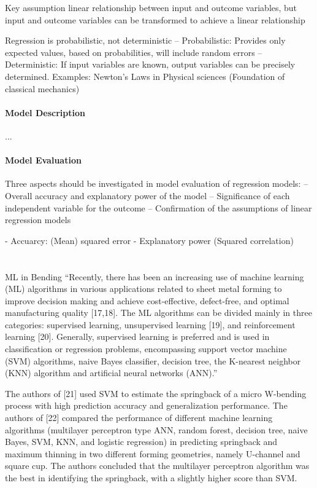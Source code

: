 Key assumption linear relationship between input and outcome variables, but input and outcome variables can be transformed to achieve a linear relationship 

Regression is probabilistic, not deterministic 
– Probabilistic: Provides only expected values, based on probabilities, will include random errors 
– Deterministic: If input variables are known, output variables can be precisely determined. Examples: Newton’s Laws in Physical sciences (Foundation of classical mechanics)

\paragraph{Model Description}
...

\paragraph{Model Evaluation} 
Three aspects should be investigated in model evaluation of regression models: 
– Overall accuracy and explanatory power of the model 
– Significance of each independent variable for the outcome 
– Confirmation of the assumptions of linear regression models

- Accuarcy: (Mean) squared error 
- Explanatory power (Squared correlation)


\section{}{ML in Bending}
“Recently, there has been an increasing use of machine learning (ML) algorithms in various applications related to sheet metal forming to improve decision making and achieve cost-effective, defect-free, and optimal manufacturing quality [17,18]. The ML algorithms can be divided mainly in three categories: supervised learning, unsupervised learning [19], and reinforcement learning [20]. Generally, supervised learning is preferred and is used in classification or regression problems, encompassing support vector machine (SVM) algorithms, naive Bayes classifier, decision tree, the K-nearest neighbor (KNN) algorithm and artificial neural networks (ANN).” 
\cite{cruz_applicationmachinelearning_2021}

The authors of [21] used SVM to estimate the springback of a micro W-bending process with high prediction accuracy and generalization performance. The authors of [22] compared the performance of different machine learning algorithms (multilayer perceptron type ANN, random forest, decision tree, naive Bayes, SVM, KNN, and logistic regression) in predicting springback and maximum thinning in two different forming geometries, namely U-channel and square cup. The authors concluded that the multilayer perceptron algorithm was the best in identifying the springback, with a slightly higher score than SVM.
\cite{cruz_applicationmachinelearning_2021}


